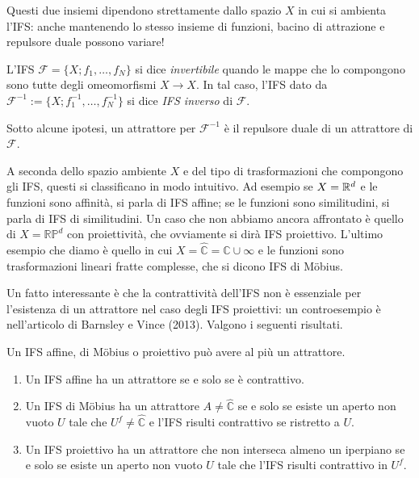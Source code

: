 \begin{osservazione}
	Questi due insiemi dipendono strettamente dallo spazio $X$ in cui si ambienta l'IFS: anche mantenendo lo stesso insieme di funzioni, bacino di attrazione e repulsore duale possono variare!
\end{osservazione}

\begin{definizione}
	L'IFS $\mathcal F = \{X; f_{1},\dots,f_{N}\}$ si dice \emph{invertibile} quando le mappe che lo compongono sono tutte degli omeomorfismi $X\to X$. In tal caso, l'IFS dato da $\mathcal F^{-1}:=\{X; f_{1}^{-1}, \dots, f_{N}^{-1}\}$ si dice \emph{IFS inverso} di $\mathcal F$.
\end{definizione}
Sotto alcune ipotesi, un attrattore per $\mathcal F^{-1}$ è il repulsore duale di un attrattore di $\mathcal F$.

A seconda dello spazio ambiente $X$ e del tipo di trasformazioni che compongono gli IFS, questi si classificano in modo intuitivo. Ad esempio se $X = \mathbb{R}^{d}$ e le funzioni sono affinità, si parla di IFS affine; se le funzioni sono similitudini, si parla di IFS di similitudini. Un caso che non abbiamo ancora affrontato è quello di $X = \mathbb{RP}^{d}$ con proiettività, che ovviamente si dirà IFS proiettivo. L'ultimo esempio che diamo è quello in cui $X = \hat{\mathbb C} = \mathbb C\cup \infty$ e le funzioni sono trasformazioni lineari fratte complesse, che si dicono IFS di M\"obius.

Un fatto interessante è che la contrattività dell'IFS non è essenziale per l'esistenza di un attrattore nel caso degli IFS proiettivi: un controesempio è nell'articolo di Barnsley e Vince (2013). Valgono i seguenti risultati.

\begin{teorema}
	Un IFS affine, di M\"obius o proiettivo può avere al più un attrattore.
\end{teorema}
\begin{teorema}
	\begin{enumerate}
		\item Un IFS affine ha un attrattore se e solo se è contrattivo.
		\item Un IFS di M\"obius ha un attrattore $A\neq\hat{\mathbb C}$ se e solo se esiste un aperto non vuoto $U$ tale che $U^{f}\neq\hat{\mathbb C}$ e l'IFS risulti contrattivo se ristretto a $U$.
		\item Un IFS proiettivo ha un attrattore che non interseca almeno un iperpiano se e solo se esiste un aperto non vuoto $U$ tale che l'IFS risulti contrattivo in $U^{f}$.
	\end{enumerate}
\end{teorema}

